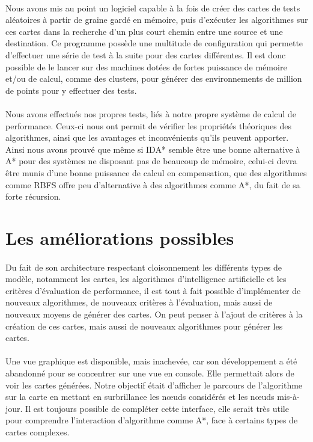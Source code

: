 \documentclass[pidr]{tnreport}
\begin{document}
\paragraph{}
Nous avons mis au point un logiciel capable à la fois de créer des cartes de tests aléatoires à partir de graine gardé en mémoire, puis d'exécuter les algorithmes sur ces cartes dans la recherche d'un plus court chemin entre une source et une destination. Ce programme possède une multitude de configuration qui permette d'effectuer une série de test à la suite pour des cartes différentes. Il est donc possible de le lancer sur des machines dotées de fortes puissance de mémoire et/ou de calcul, comme des clusters, pour générer des environnements de million de points pour y effectuer des tests.

\paragraph{}
Nous avons effectués nos propres tests, liés à notre propre système de calcul de performance. Ceux-ci nous ont permit de vérifier les propriétés théoriques des algorithmes, ainsi que les avantages et inconvénients qu'ils peuvent apporter. Ainsi nous avons prouvé que même si IDA* semble être une bonne alternative à A* pour des systèmes ne disposant pas de beaucoup de mémoire, celui-ci devra être munis d'une bonne puissance de calcul en compensation, que des algorithmes comme RBFS offre peu d'alternative à des algorithmes comme A*, du fait de sa forte récursion.   

\section{Les améliorations possibles}
\paragraph{}
Du fait de son architecture respectant cloisonnement les différents types de modèle, notamment les cartes, les algorithmes d'intelligence artificielle et les critères d'évaluation de performance, il est tout à fait possible d'implémenter de nouveaux algorithmes, de nouveaux critères à l'évaluation, mais aussi de nouveaux moyens de générer des cartes. On peut penser à l'ajout de critères à la création de ces cartes, mais aussi de nouveaux algorithmes pour générer les cartes. 

\paragraph{}
Une vue graphique est disponible, mais inachevée, car son développement a été abandonné pour se concentrer sur une vue en console. Elle permettait alors de voir les cartes générées. Notre objectif était d'afficher le parcours de l'algorithme sur la carte en mettant en surbrillance les nœuds considérés et les nœuds mis-à-jour. Il est toujours possible de compléter cette interface, elle serait très utile pour comprendre l'interaction d'algorithme comme A*, face à certains types de cartes complexes. 
\end{document}
